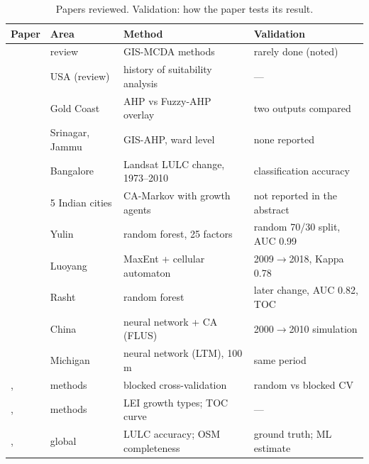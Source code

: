 \begin{table}[ht]
  \centering\small
  \caption{Papers reviewed. Validation: how the paper tests its result.}
  \label{tab:literature}
  \begin{tabularx}{\textwidth}{@{}L{3.3cm} L{2.3cm} Y Y@{}}
    \toprule
    Paper & Area & Method & Validation \\
    \midrule
    \citet{malczewski2004} & review & GIS-MCDA methods & rarely done (noted) \\
    \citet{collins2001} & USA (review) & history of suitability analysis & --- \\
    \citet{mosadeghi2015} & Gold Coast & AHP vs Fuzzy-AHP overlay & two outputs compared \\
    \citet{parry2018} & Srinagar, Jammu & GIS-AHP, ward level & none reported \\
    \citet{ramachandra2012} & Bangalore & Landsat LULC change, 1973--2010 & classification accuracy \\
    \citet{bharath2018} & 5 Indian cities & CA-Markov with growth agents & not reported in the abstract \\
    \citet{li2024} & Yulin & random forest, 25 factors & random 70/30 split, AUC 0.99 \\
    \citet{wang2021} & Luoyang & MaxEnt + cellular automaton & 2009$\to$2018, Kappa 0.78 \\
    \citet{ahmadlou2016} & Rasht & random forest & later change, AUC 0.82, TOC \\
    \citet{liu2017flus} & China & neural network + CA (FLUS) & 2000$\to$2010 simulation \\
    \citet{pijanowski2002} & Michigan & neural network (LTM), 100\,m & same period \\
    \citet{roberts2017}, \citet{ploton2020} & methods & blocked cross-validation & random vs blocked CV \\
    \citet{liu2010lei}, \citet{pontius2014} & methods & LEI growth types; TOC curve & --- \\
    \citet{venter2022}, \citet{herfort2023} & global & LULC accuracy; OSM completeness & ground truth; ML estimate \\
    \bottomrule
  \end{tabularx}
\end{table}

